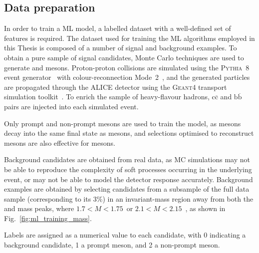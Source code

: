 \subsection{Data preparation}\label{sec:ml_data_preparation}
In order to train a ML model, a labelled dataset with a well-defined set of features is required. The dataset used for training the ML algorithms employed in this Thesis is composed of a number of signal and background examples. To obtain a pure sample of signal candidates, Monte Carlo techniques are used to generate \ds and \dpl mesons. Proton-proton collisions are simulated using the \textsc{Pythia~8} event generator~\cite{Bierlich:2022pfr} with colour-reconnection Mode~2~\cite{Christiansen:2015yqa}, and the generated particles are propagated through the ALICE detector using the \textsc{Geant4} transport simulation toolkit~\cite{GEANT4:2002zbu}. To enrich the sample of heavy-flavour hadrons, $\mathrm{c\overline{c}}$ and $\mathrm{b\overline{b}}$ pairs are injected into each simulated event. 



Only prompt and non-prompt \ds mesons are used to train the model, as \dpl mesons decay into the same final state as \ds mesons, and selections optimised to reconstruct \ds mesons are also effective for \dpl mesons. 

Background candidates are obtained from real data, as MC simulations may not be able to reproduce the complexity of soft processes occurring in the underlying event, or may not be able to model the detector response accurately. Background examples are obtained by selecting candidates from a subsample of the full data sample (corresponding to its 3\%) in an invariant-mass region away from both the \ds and \dpl mass peaks, where $1.7 < M < 1.75$~\gevcc or \mbox{$2.1 < M < 2.15$~\gevcc}, as shown in Fig.~\ref{fig:ml_training_mass}. 

Labels are assigned as a numerical value to each candidate, with 0 indicating a background candidate, 1 a prompt \ds meson, and 2 a non-prompt \ds meson.

